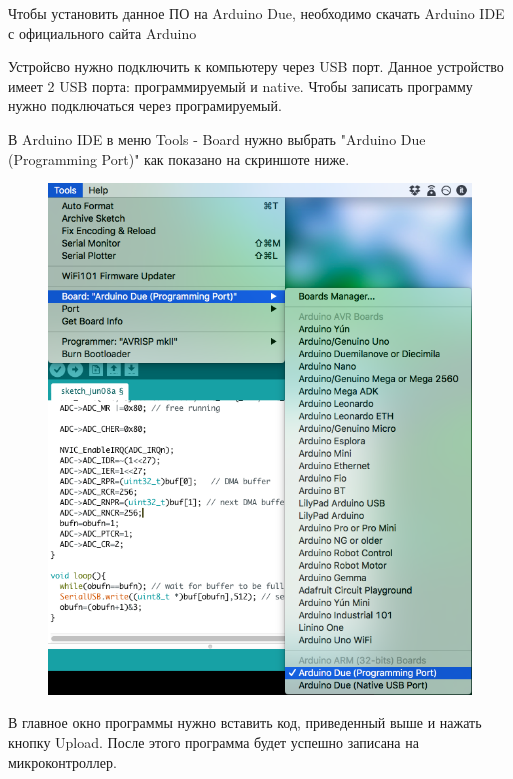 \documentclass[../paper.tex]{subfiles}
\begin{document}
Чтобы установить данное ПО на Arduino Due, необходимо скачать Arduino IDE с официального сайта Arduino\cite{arduino-ide}

Устройсво нужно подключить к компьютеру через USB порт. Данное устройство имеет 2 USB порта: программируемый и native. Чтобы записать программу нужно подключаться через програмируемый.

В Arduino IDE в меню Tools - Board нужно выбрать "Arduino Due (Programming Port)" как показано на скриншоте ниже.
\begin{figure}[H]
\centering
\includegraphics[width=16cm]{images/ard-board-select.png}
\end{figure}

В главное окно программы нужно вставить код, приведенный выше и нажать кнопку Upload. После этого программа будет успешно записана на микроконтроллер.
\end{document}
